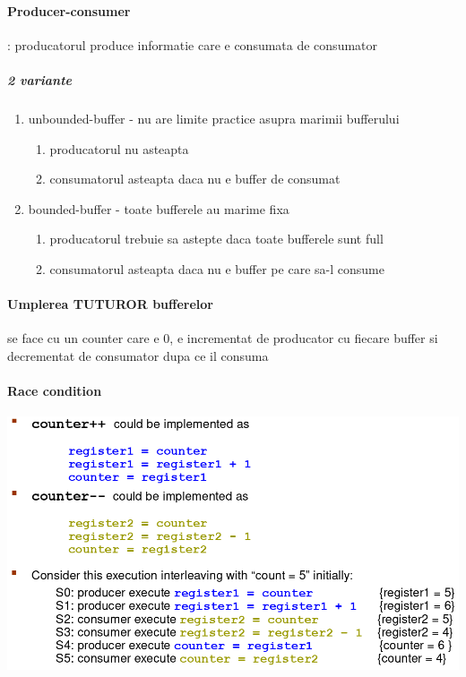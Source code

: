 \documentclass{article}
\begin{document}
\paragraph*{Producer-consumer}: producatorul produce informatie care e consumata de consumator
\subparagraph*{2 variante}
\begin{enumerate}
    \item unbounded-buffer - nu are limite practice asupra marimii bufferului
          \begin{enumerate}
              \item producatorul nu asteapta
              \item consumatorul asteapta daca nu e buffer de consumat
          \end{enumerate}
    \item bounded-buffer - toate bufferele au marime fixa
          \begin{enumerate}
              \item producatorul trebuie sa astepte daca toate bufferele sunt full
              \item consumatorul asteapta daca nu e buffer pe care sa-l consume
          \end{enumerate}
\end{enumerate}

\paragraph*{Umplerea TUTUROR bufferelor} se face cu un counter care e 0, e incrementat de producator cu fiecare buffer si decrementat de consumator dupa ce il consuma

\paragraph*{Race condition}

\begin{center}
    \includegraphics[scale=0.3]{6_racecondition.png}
\end{center}
\end{document}

